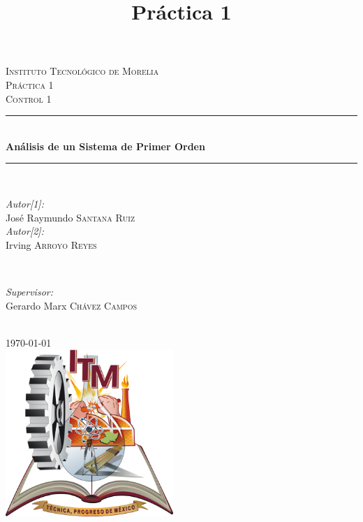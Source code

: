 \documentclass[12pt]{article}
\begin{document}
\begin{titlepage}

\newcommand{\HRule}{\rule{\linewidth}{0.5mm}} 
\center 
 

\title{Práctica 1}
\textsc{\LARGE Instituto Tecnológico de Morelia}\\[1.1cm]
\textsc{\Large Práctica 1}\\[0.3cm]
\textsc{\large Control 1}\\[0.3cm] 

\HRule \\[0.4cm]
{ \huge \bfseries Análisis de un Sistema de Primer Orden}\\[0.2cm] 
\HRule \\[1cm]

\begin{minipage}{0.5\textwidth}
\begin{flushleft} \large
\emph{Autor[1]:}\\
José Raymundo \textsc{Santana Ruiz} \\
\emph{Autor[2]:}\\
Irving \textsc{Arroyo Reyes}
\end{flushleft}
\end{minipage}
~
\begin{minipage}{0.4\textwidth}
\begin{flushright} \large
\emph{Supervisor:} \\
Gerardo Marx \textsc{Chávez Campos} 
\end{flushright}
\end{minipage}\\[1cm]
{\large \today}\\[1cm]
\includegraphics[width=2.5in]{Itmorelia.png}\\[1cm] 
\vfill %
\end{titlepage}
\end{document}
